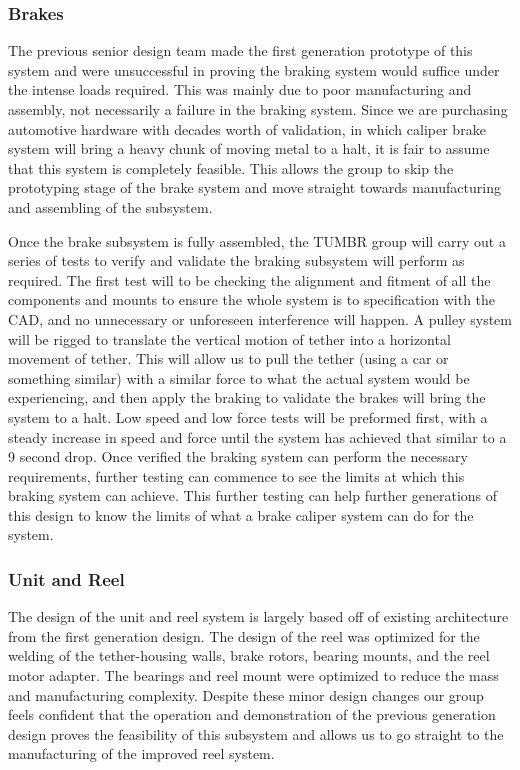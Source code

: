 
\subsubsection{Brakes}

\indent\indent The previous senior design team made the first generation prototype of this system and were unsuccessful in proving the braking system would suffice under the intense loads required. This was mainly due to poor manufacturing and assembly, not necessarily a failure in the braking system. Since we are purchasing automotive hardware with decades worth of validation, in which caliper brake system will bring a heavy chunk of moving metal to a halt, it is fair to assume that this system is completely feasible. This allows the group to skip the prototyping stage of the brake system and move straight towards manufacturing and assembling of the subsystem.

Once the brake subsystem is fully assembled, the TUMBR group will carry out a series of tests to verify and validate the braking subsystem will perform as required. The first test will to be checking the alignment and fitment of all the components and mounts to ensure the whole system is to specification with the CAD, and no unnecessary or unforeseen interference will happen. A pulley system will be rigged to translate the vertical motion of tether into a horizontal movement of tether. This will allow us to pull the tether (using a car or something similar) with a similar force to what the actual system would be experiencing, and then apply the braking to validate the brakes will bring the system to a halt. Low speed and low force tests will be preformed first, with a steady increase in speed and force until the system has achieved that similar to a 9 second drop. Once verified the braking system can perform the necessary requirements, further testing can commence to see the limits at which this braking system can achieve. This further testing can help further generations of this design to know the limits of what a brake caliper system can do for the system. 


\subsubsection{Unit and Reel}

\indent\indent The design of the unit and reel system is largely based off of existing architecture from the first generation design. The design of the reel was optimized for the welding of the tether-housing walls, brake rotors, bearing mounts, and the reel motor adapter. The bearings and reel mount were optimized to reduce the mass and manufacturing complexity.
Despite these minor design changes our group feels confident that the operation and demonstration of the previous generation design proves the feasibility of this subsystem and allows us to go straight to the manufacturing of the improved reel system. 

